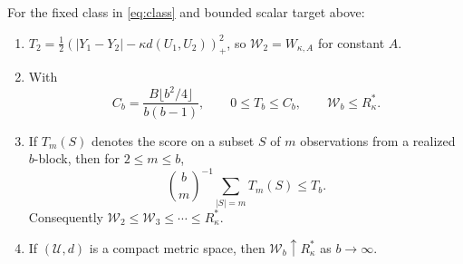 \begin{theorem}
\label{thm:hierarchy}
For the fixed class in \eqref{eq:class} and bounded scalar target above:
\begin{enumerate}
\item $T_2=\frac12(|Y_1-Y_2|-\kappa d(U_1,U_2))_+^2$, so
$\mathcal W_2=W_{\kappa,A}$ for constant $A$.
\item With
\begin{equation}
 C_b=\frac{B\lfloor b^2/4\rfloor}{b(b-1)},
 \qquad 0\leq T_b\leq C_b,
 \qquad \mathcal W_b\leq R^*_\kappa.
 \label{eq:range}
\end{equation}
\item If $T_m(S)$ denotes the score on a subset $S$ of $m$ observations
from a realized $b$-block, then for $2\leq m\leq b$,
\begin{equation}
 \binom bm^{-1}\sum_{|S|=m}T_m(S)\leq T_b.
 \label{eq:subset}
\end{equation}
Consequently $\mathcal W_2\leq\mathcal W_3\leq\cdots\leq R^*_\kappa$.
\item If $(\mathcal U,d)$ is a compact metric space, then
$\mathcal W_b\uparrow R^*_\kappa$ as $b\to\infty$.
\end{enumerate}
\end{theorem}

